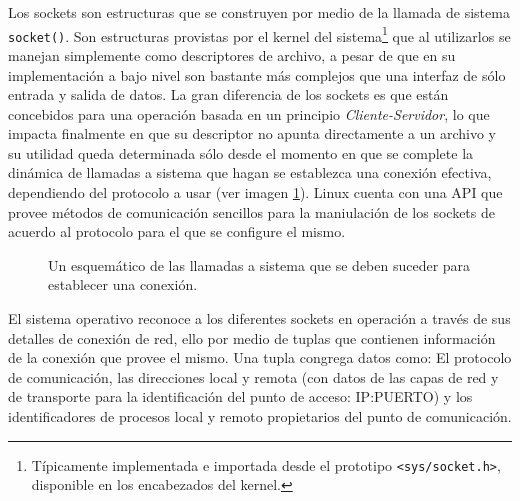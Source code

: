 Los sockets son estructuras que se construyen por medio de la llamada de sistema \verb=socket()=. Son estructuras provistas por el kernel del sistema\footnote{Típicamente implementada e importada desde el prototipo \verb=<sys/socket.h>=, disponible en los encabezados del kernel.} que al utilizarlos se manejan simplemente como descriptores de archivo, a pesar de que en su implementación a bajo nivel son bastante más complejos que una interfaz de sólo entrada y salida de datos. La gran diferencia de los sockets es que están concebidos para una operación basada en un principio \emph{Cliente-Servidor}, lo que impacta finalmente en que su descriptor no apunta directamente a un archivo y su utilidad queda determinada sólo desde el momento en que se complete la dinámica de llamadas a sistema que hagan se establezca una conexión efectiva, dependiendo del protocolo a usar (ver imagen \ref{fig:socketHandshake}). Linux cuenta con una API que provee métodos de comunicación sencillos para la maniulación de los sockets de acuerdo al protocolo para el que se configure el mismo.

\begin{figure}[h!]
	\centering
	\caption{Un esquemático de las llamadas a sistema que se deben suceder para establecer una conexión.}
	\label{fig:socketHandshake}
\end{figure}

El sistema operativo reconoce a los diferentes sockets en operación a través de sus detalles de conexión de red, ello por medio de tuplas que contienen información de la conexión que provee el mismo. Una tupla congrega datos como: El protocolo de comunicación, las direcciones local y remota (con datos de las capas de red y de transporte para la identificación del punto de acceso: IP:PUERTO) y los identificadores de procesos local y remoto propietarios del punto de comunicación.

